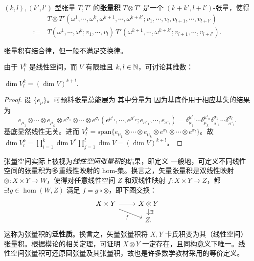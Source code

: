 \begin{definition}
    $(k,l),(k',l')$ 型张量 $T,T'$ 的\textbf{张量积} $T\otimes T'$ 是一个 $(k+k',l+l')$-张量，使得
\begin{align}
    &T\otimes T'(\omega^1,\cdots,\omega^k,\omega^{k+1},\cdots,\omega^{k+k'};v_1,\cdots,v_l,v_{l+1},\cdots,v_{l+l'})\nonumber\\
    :=\ &T(\omega^1,\cdots,\omega^k;v_1,\cdots,v_l)\,T'(\omega^{k+1},\cdots,\omega^{k+k'};v_{l+1},\cdots,v_{l+l'}).
\end{align}
\end{definition}
\begin{remark}
    张量积有结合律，但一般不满足交换律。
\end{remark}
由于 $V^k_l$ 是线性空间，而 $V$ 有限维且 $k,l\in\mathbb{N}$，可讨论其维数：
\begin{theorem}
    $\dim V^k_l=(\dim V)^{k+l}.$
\end{theorem}
\begin{proof}
    设 $\{e_\mu\}$。可预料张量总能展为
其中分量为
因为基底作用于相应基失的结果为
    \[e_{\mu_1}\otimes\cdots\otimes e_{\mu_k}\otimes e^{\sigma_1}\otimes\cdots\otimes e^{\sigma_l}(e^{\mu'_1},\cdots,e^{\mu'_k};e_{\sigma'_1},\cdots,e_{\sigma'_l})=\delta^{\mu'_1}_{\mu_1}\cdots\delta^{\mu'_k}_{\mu_k}\delta^{\sigma_1}_{\sigma'_1}\cdots\delta^{\sigma_l}_{\sigma'_l}.\]
基底显然线性无关。进而 $V_l^k=\mathrm{span}\{e_{\mu_1}\otimes\cdots\otimes e_{\mu_k}\otimes e^{\sigma_1}\otimes\cdots\otimes e^{\sigma_l}\}$。故 $\dim V_l^k=\prod_{i=1}^k\dim V^*\prod_{j=1}^l\dim V=(\dim V)^{k+l}$。
\end{proof}

张量空间实际上被视为\emph{线性空间张量积}的结果，即定义
一般地，可定义不同线性空间的张量积为多重线性映射的 hom-集。换言之，矢量张量积是双线性映射 $\otimes:X\times Y\to W$，使得对任意线性空间 $Z$ 和双线性映射 $f: X\times Y\to Z$，都 $\exists!g\in\hom(W,Z)$ 满足 $f=g\circ\otimes$，即下图交换：
    \[ \begin{tikzcd}[row sep=small]
        X \times Y \arrow[rd, "f"'] \arrow[r] & X\otimes Y \arrow[d, "\exists!"] \\
        & Z.
    \end{tikzcd} \]
这称为张量积的\textbf{泛性质}。换言之，矢量张量积将 $X,Y$ 卡氏积变为其（线性空间）张量积。根据模论的相关定理，可证明 $X\otimes Y$ 一定存在，且同构意义下唯一。线性空间张量积可还原回张量及其张量积，故也是许多数学教材采用的等价定义。

